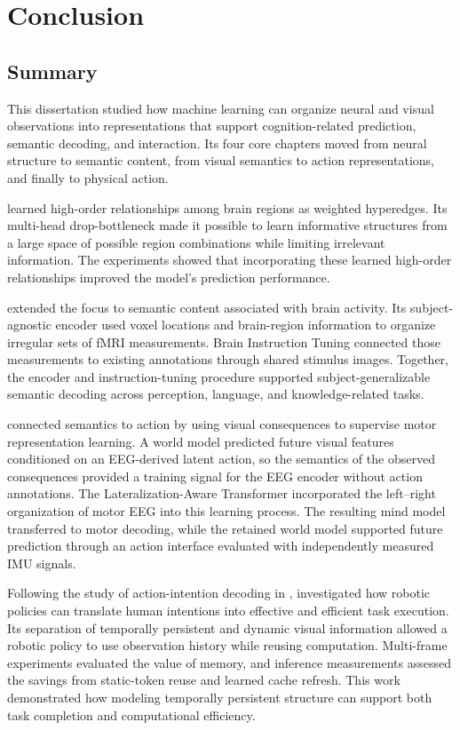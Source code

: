 \chapter{Conclusion}
\label{chapter:conclusion}

\section{Summary}
\label{sec:conclusion_summary}

This dissertation studied how machine learning can organize neural and visual observations into representations that support cognition-related prediction, semantic decoding, and interaction. Its four core chapters moved from neural structure to semantic content, from visual semantics to action representations, and finally to physical action.

\hybrid{} learned high-order relationships among brain regions as weighted hyperedges. Its multi-head drop-bottleneck made it possible to learn informative structures from a large space of possible region combinations while limiting irrelevant information. The experiments showed that incorporating these learned high-order relationships improved the model's prediction performance.

\mindllm{} extended the focus to semantic content associated with brain activity. Its subject-agnostic encoder used voxel locations and brain-region information to organize irregular sets of fMRI measurements. Brain Instruction Tuning connected those measurements to existing annotations through shared stimulus images. Together, the encoder and instruction-tuning procedure supported subject-generalizable semantic decoding across perception, language, and knowledge-related tasks.

\mwm{} connected semantics to action by using visual consequences to supervise motor representation learning. A world model predicted future visual features conditioned on an EEG-derived latent action, so the semantics of the observed consequences provided a training signal for the EEG encoder without action annotations. The Lateralization-Aware Transformer incorporated the left--right organization of motor EEG into this learning process. The resulting mind model transferred to motor decoding, while the retained world model supported future prediction through an action interface evaluated with independently measured IMU signals.

Following the study of action-intention decoding in \mwm{}, \dysta{} investigated how robotic policies can translate human intentions into effective and efficient task execution. Its separation of temporally persistent and dynamic visual information allowed a robotic policy to use observation history while reusing computation. Multi-frame experiments evaluated the value of memory, and inference measurements assessed the savings from static-token reuse and learned cache refresh. This work demonstrated how modeling temporally persistent structure can support both task completion and computational efficiency.

